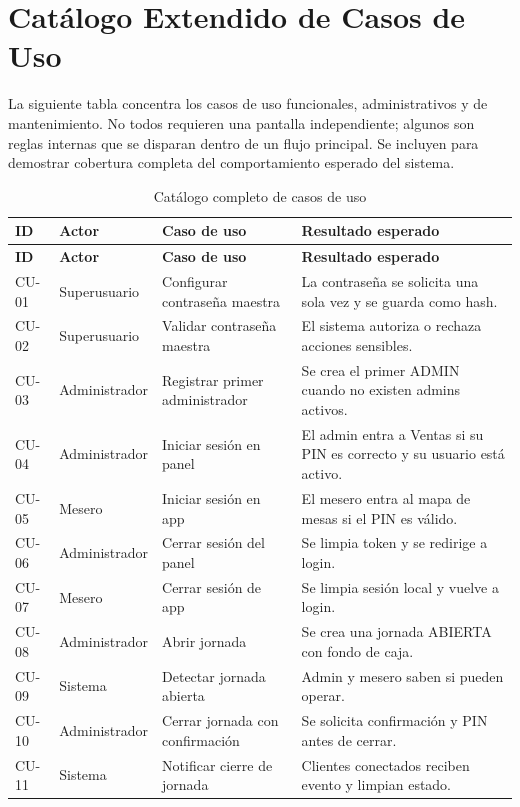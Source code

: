 \documentclass[11pt,letterpaper,openany]{report}
\begin{document}
\section{Catálogo Extendido de Casos de Uso}

La siguiente tabla concentra los casos de uso funcionales, administrativos y de mantenimiento. No todos requieren una pantalla independiente; algunos son reglas internas que se disparan dentro de un flujo principal. Se incluyen para demostrar cobertura completa del comportamiento esperado del sistema.

{\footnotesize
\begin{longtable}{p{}p{}p{}p{}}
\caption{Catálogo completo de casos de uso}\\
\toprule
\textbf{ID} & \textbf{Actor} & \textbf{Caso de uso} & \textbf{Resultado esperado}\\
\midrule
\endfirsthead
\toprule
\textbf{ID} & \textbf{Actor} & \textbf{Caso de uso} & \textbf{Resultado esperado}\\
\midrule
\endhead
CU-01 & Superusuario & Configurar contraseña maestra & La contraseña se solicita una sola vez y se guarda como hash.\\
CU-02 & Superusuario & Validar contraseña maestra & El sistema autoriza o rechaza acciones sensibles.\\
CU-03 & Administrador & Registrar primer administrador & Se crea el primer ADMIN cuando no existen admins activos.\\
CU-04 & Administrador & Iniciar sesión en panel & El admin entra a Ventas si su PIN es correcto y su usuario está activo.\\
CU-05 & Mesero & Iniciar sesión en app & El mesero entra al mapa de mesas si el PIN es válido.\\
CU-06 & Administrador & Cerrar sesión del panel & Se limpia token y se redirige a login.\\
CU-07 & Mesero & Cerrar sesión de app & Se limpia sesión local y vuelve a login.\\
CU-08 & Administrador & Abrir jornada & Se crea una jornada ABIERTA con fondo de caja.\\
CU-09 & Sistema & Detectar jornada abierta & Admin y mesero saben si pueden operar.\\
CU-10 & Administrador & Cerrar jornada con confirmación & Se solicita confirmación y PIN antes de cerrar.\\
CU-11 & Sistema & Notificar cierre de jornada & Clientes conectados reciben evento y limpian estado.\\

\end{longtable}}
\end{document}
